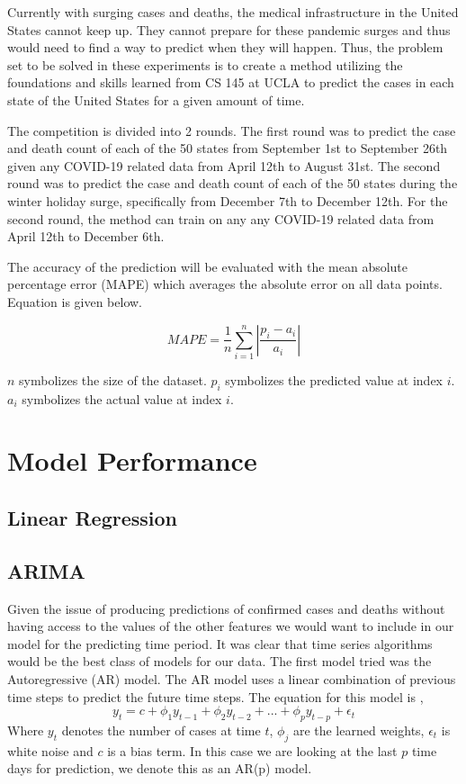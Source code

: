 \documentclass[sigconf,nonacm]{acmart}
\begin{document}
Currently with surging cases and deaths, the medical infrastructure in the
United States cannot keep up. They cannot prepare for these pandemic surges and
thus would need to find a way to predict when they will happen. Thus, the
problem set to be solved in these experiments is to create a method utilizing
the foundations and skills learned from CS 145 at UCLA to predict the cases in
each state of the United States for a given amount of time. 


The competition is divided into 2 rounds. The first round was to predict the
case and death count of each of the 50 states from September 1st to September
26th given any COVID-19 related data from April 12th to August 31st. The second
round was to predict the case and death count of each of the 50 states during
the winter holiday surge, specifically from December 7th to December 12th. For
the second round, the method can train on any any COVID-19 related data from
April 12th to December 6th. 

The accuracy of the prediction will be evaluated with the mean absolute
percentage error (MAPE) which averages the absolute error on all data points.
Equation is given below.

$$MAPE = \frac{1}{n} \sum_{i = 1}^{n} |\frac{p_i - a_i}{a_i} |$$

$n$ symbolizes the size of the dataset. $p_i$ symbolizes the predicted value at
index $i$. $a_i$ symbolizes the actual value at index $i$.


\section{Model Performance}
\subsection{Linear Regression}
\subsection{ARIMA}
Given the issue of producing predictions of confirmed cases and deaths without
having access to the values of the other features we would want to include in 
our model for the predicting time period. It was clear that time series algorithms
would be the best class of models for our data. The first model tried was the
Autoregressive (AR) model. The AR model uses a linear combination of previous
time steps to predict the future time steps. The equation for this model is \cite{forecasting},
\begin{equation}
 y_t = c + \phi_1 y_{t-1} + \phi_2 y_{t-2} + ... + \phi_p y_{t-p} + \epsilon_t 
\end{equation}
Where $y_t$ denotes the number of cases at time $t$, $\phi_j$ are the learned weights,
 $\epsilon_t$ is white noise and $c$ is a bias term. In this case we are looking at the last $p$ time days
for prediction, we denote this as an AR(p) model. 
\end{document}
